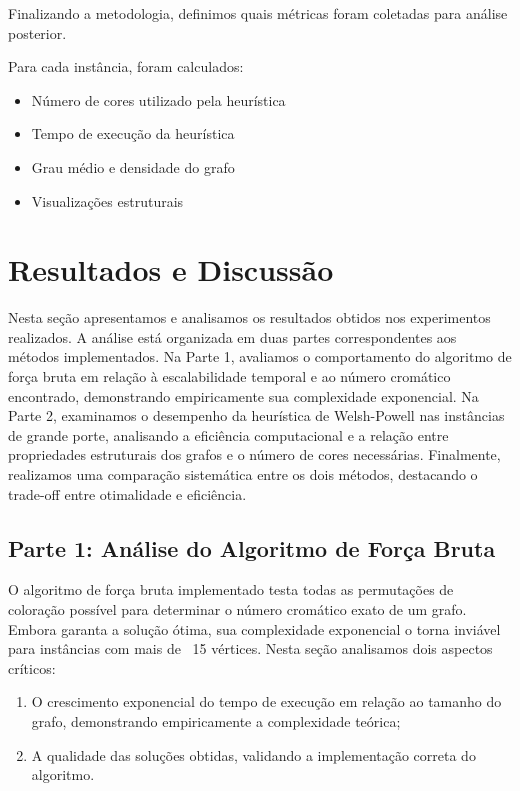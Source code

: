 \documentclass[12pt]{article}
\begin{document}
Finalizando a metodologia, definimos quais métricas foram coletadas para análise posterior.

Para cada instância, foram calculados:

\begin{itemize}
    \item Número de cores utilizado pela heurística
    \item Tempo de execução da heurística
    \item Grau médio e densidade do grafo
    \item Visualizações estruturais
\end{itemize}

\newpage
\section{Resultados e Discussão}

Nesta seção apresentamos e analisamos os resultados obtidos nos experimentos realizados. A análise está organizada em duas partes correspondentes aos métodos implementados. Na Parte 1, avaliamos o comportamento do algoritmo de força bruta em relação à escalabilidade temporal e ao número cromático encontrado, demonstrando empiricamente sua complexidade exponencial. Na Parte 2, examinamos o desempenho da heurística de Welsh-Powell nas instâncias de grande porte, analisando a eficiência computacional e a relação entre propriedades estruturais dos grafos e o número de cores necessárias. Finalmente, realizamos uma comparação sistemática entre os dois métodos, destacando o trade-off entre otimalidade e eficiência.

\subsection{Parte 1: Análise do Algoritmo de Força Bruta}

O algoritmo de força bruta implementado testa todas as permutações de coloração possível para determinar o número cromático exato de um grafo. Embora garanta a solução ótima, sua complexidade exponencial o torna inviável para instâncias com mais de ~15 vértices. Nesta seção analisamos dois aspectos críticos:

\begin{enumerate}
    \item O crescimento exponencial do tempo de execução em relação ao tamanho do grafo, demonstrando empiricamente a complexidade teórica;
    \item A qualidade das soluções obtidas, validando a implementação correta do algoritmo.
\end{enumerate}
\end{document}
